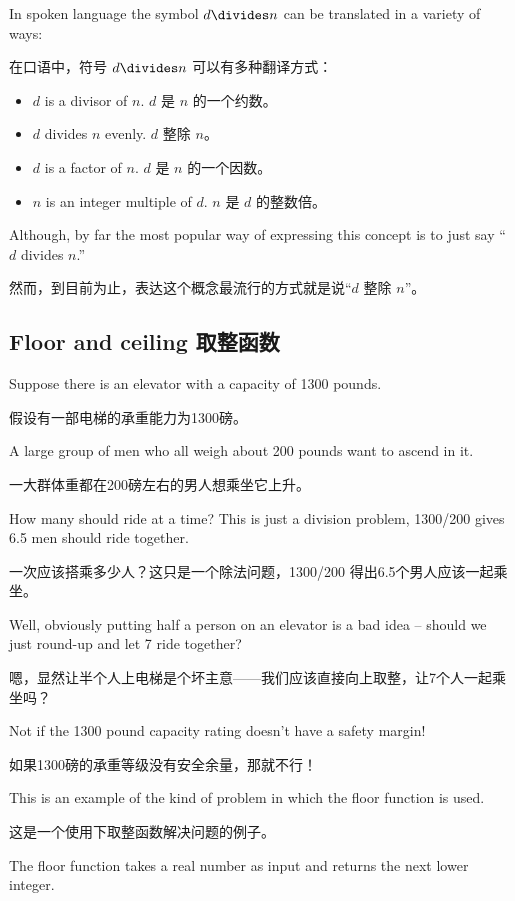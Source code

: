 In spoken language the symbol $d \divides n$ can be translated in a variety 
of ways:

在口语中，符号 $d \divides n$ 可以有多种翻译方式：

\begin{itemize}
\item $d$ is a divisor of $n$.
$d$ 是 $n$ 的一个约数。
\item $d$ divides $n$ evenly.
 $d$ 整除 $n$。
\item $d$ is a factor of $n$.
 $d$ 是 $n$ 的一个因数。
\item $n$ is an integer multiple of $d$.
 $n$ 是 $d$ 的整数倍。
\end{itemize}

Although, by far the most popular way of expressing this concept is to just say ``$d$ divides $n$.''

然而，到目前为止，表达这个概念最流行的方式就是说“$d$ 整除 $n$”。

\subsection{Floor and ceiling 取整函数}
\label{floor}

Suppose there is an elevator with a capacity of 1300 pounds.

假设有一部电梯的承重能力为1300磅。

A large
group of men who all weigh about 200 pounds want to ascend in it.

一大群体重都在200磅左右的男人想乘坐它上升。

How
many should ride at a time?  This is just a division problem, 1300/200
gives 6.5 men should ride together.

一次应该搭乘多少人？这只是一个除法问题，1300/200 得出6.5个男人应该一起乘坐。

Well, obviously putting half a
person on an elevator is a bad idea -- should we just round-up and 
let 7 ride together?

嗯，显然让半个人上电梯是个坏主意——我们应该直接向上取整，让7个人一起乘坐吗？

Not if the 1300 pound capacity rating doesn't
have a safety margin!

如果1300磅的承重等级没有安全余量，那就不行！

This is an example of the kind of problem
in which the floor function is used.

这是一个使用下取整函数解决问题的例子。

The 
floor function takes a real number as input and returns the next 
lower integer.

